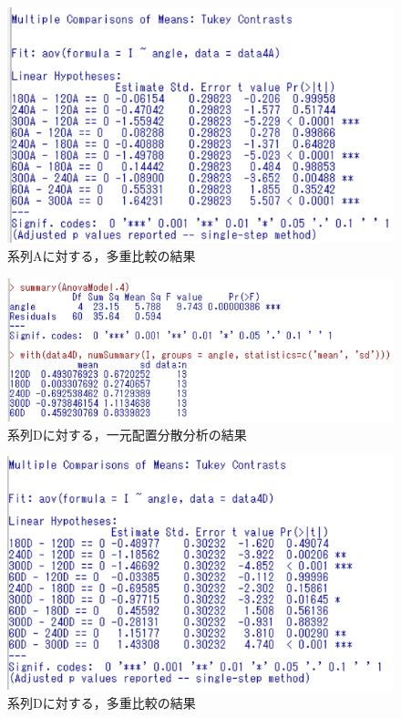 \documentclass{jlreq}
\numberwithin{equation}{section}
\begin{document}
\begin{figure}[H]
  \centering
  \includegraphics{image/about_A(多重).png}
  \caption{系列Aに対する，多重比較の結果}
  \label{fig:about_A_multi}
\end{figure}

\begin{figure}[H]
  \centering
  \includegraphics{image/about_D(一元).png}
  \caption{系列Dに対する，一元配置分散分析の結果}
  \label{fig:about_D_oneway}
\end{figure}

\begin{figure}[H]
  \centering
  \includegraphics{image/about_D(多重).png}
  \caption{系列Dに対する，多重比較の結果}
  \label{fig:about_D_multi}
\end{figure}
\end{document}
